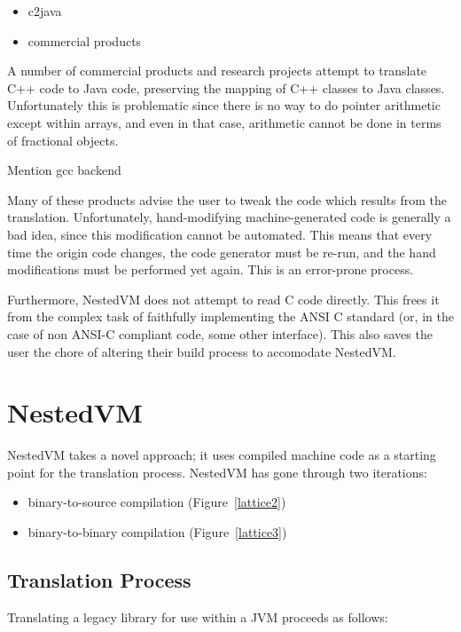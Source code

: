 \documentclass{acmconf}
\begin{document}
\begin{itemize}
\item c2java
\item commercial products
\end{itemize}

A number of commercial products and research projects attempt to
translate C++ code to Java code, preserving the mapping of C++ classes
to Java classes.  Unfortunately this is problematic since there is no
way to do pointer arithmetic except within arrays, and even in that
case, arithmetic cannot be done in terms of fractional objects.

Mention gcc backend

Many of these products advise the user to tweak the code which results
from the translation.  Unfortunately, hand-modifying machine-generated
code is generally a bad idea, since this modification cannot be
automated.  This means that every time the origin code changes, the
code generator must be re-run, and the hand modifications must be
performed yet again.  This is an error-prone process.

Furthermore, NestedVM does not attempt to read C code directly.  This
frees it from the complex task of faithfully implementing the ANSI C
standard (or, in the case of non ANSI-C compliant code, some other
interface).  This also saves the user the chore of altering their
build process to accomodate NestedVM.

\section{NestedVM}

NestedVM takes a novel approach; it uses compiled machine code as a
starting point for the translation process.  NestedVM has gone through
two iterations:

\begin{itemize}
\item binary-to-source compilation  (Figure~\ref{lattice2})
\item binary-to-binary compilation  (Figure~\ref{lattice3})
\end{itemize}

\subsection{Translation Process}

Translating a legacy library for use within a JVM proceeds as follows:
\end{document}
